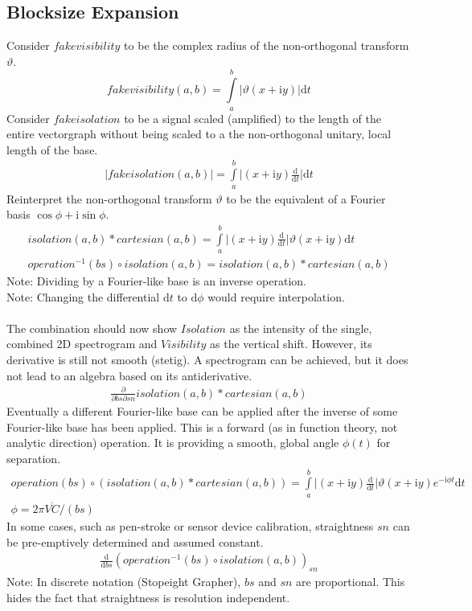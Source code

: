 \documentclass{report}
\begin{document}
\subsection{Blocksize Expansion}
Consider $fake visibility$ to be the complex radius of the non-orthogonal transform $\vartheta$.
\begin{equation}
fakevisibility(a,b)=\int \limits _{a}^{b} \lvert \vartheta (x+\mathrm{i}y) \rvert \mathrm{d}t 
\end{equation}
Consider $fake isolation$ to be a signal scaled (amplified) to the length of the entire vectorgraph without being scaled to a the non-orthogonal unitary, local length of the base.
\begin{align}
\lvert fakeisolation(a,b) \rvert = \int \limits _{a}^{b} \lvert (x+\mathrm{i}y) \frac{\mathrm{d}}{\mathrm{d}t} \rvert \mathrm{d}t
\end{align}
Reinterpret the non-orthogonal transform $\vartheta$ to be the equivalent of a Fourier basis $\cos \phi + \mathrm{i} \sin \phi$.
\begin{align}
isolation(a,b) * cartesian(a,b) = \int \limits _{a}^{b} \lvert (x+\mathrm{i}y) \frac{\mathrm{d}}{\mathrm{d}t} \rvert \vartheta (x+\mathrm{i}y) \mathrm{d}t\\
operation^{-1}(bs) \circ isolation(a,b) = isolation(a,b) * cartesian(a,b)
\end{align}
Note: Dividing by a Fourier-like base is an inverse operation.\\
Note: Changing the differential $\mathrm{d}t$ to $\mathrm{d}\phi$ would require interpolation.\\\\
The combination should now show $Isolation$ as the intensity of the single, combined 2D spectrogram and $Visibility$ as the vertical shift. However, its derivative is still not smooth (stetig). A spectrogram can be achieved, but it does not lead to an algebra based on its antiderivative.
\begin{align}
\frac{\partial}{\partial bs\partial sn} isolation(a,b) * cartesian(a,b)\label{eq:3}
\end{align}
Eventually a different Fourier-like base can be applied after the inverse of some Fourier-like base has been applied. This is a forward (as in function theory, not analytic direction) operation. It is providing a smooth, global angle $\phi(t)$ for separation.
\begin{align}
operation(bs) \circ (isolation(a,b) * cartesian(a,b)) = \int \limits _{a}^{b} \lvert (x+\mathrm{i}y) \frac{\mathrm{d}}{\mathrm{d}t} \rvert \vartheta (x+\mathrm{i}y) e^{-\mathrm{i}\phi t} \mathrm{d}t\\
\phi = 2\pi\overline{VC}/(bs)
\end{align}
In some cases, such as pen-stroke or sensor device calibration, straightness $sn$ can be pre-emptively determined and assumed constant.
\begin{align}
\frac{\mathrm{d}}{\mathrm{d} bs} (operation^{-1}(bs) \circ isolation(a,b))_{sn}
\end{align}
Note: In discrete notation (Stopeight Grapher), $bs$ and $sn$ are proportional. This hides the fact that straightness is resolution independent.
\end{document}
